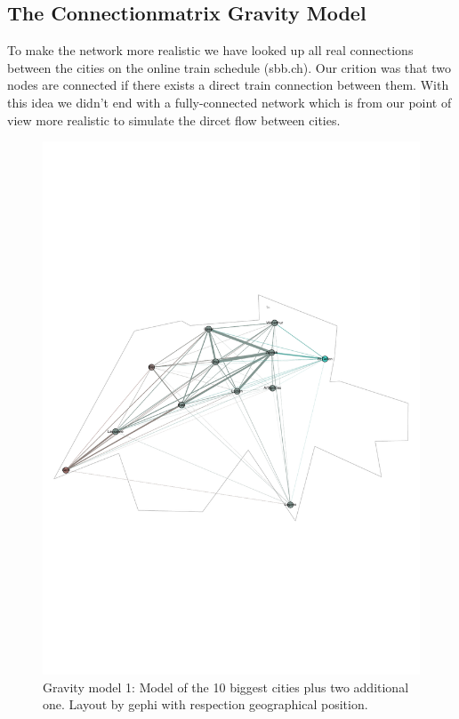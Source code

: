 \documentclass[11pt]{article}
\begin{document}
\subsection{The Connectionmatrix Gravity Model}

To make the network more realistic we have looked up all real connections between the cities on the online train schedule (sbb.ch). Our crition was that two nodes are connected if there exists a direct train connection between them. With this idea we didn't end with a fully-connected network which is from our point of view more realistic to simulate the dircet flow between cities.

\begin{figure}
\centering
\includegraphics[scale=0.25]{switzerland_network1}
 \caption{Gravity model 1: Model of the 10 biggest cities plus two additional one. Layout by gephi with respection geographical position.}
\end{figure}
\end{document}

